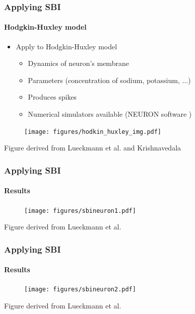 \documentclass[9pt, aspectratio=169]{beamer}
\begin{document}
\begin{frame}
\frametitle{Applying SBI}
\framesubtitle{Hodgkin-Huxley model}
\begin{itemize}	
	\item Apply to Hodgkin-Huxley model \cite{hodgkin1952quantitative} 
	\begin{itemize}
		\item Dynamics of neuron's membrane
		\item Parameters (concentration of sodium, potassium, ...)
		\item Produces spikes
		\item Numerical simulators available (NEURON software \cite{carnevale2006neuron})
	\end{itemize}
\end{itemize}
\begin{figure}
	\texttt{[image: figures/hodkin\_huxley\_img.pdf]}
\end{figure}
\tiny Figure derived from Lueckmann et al. \cite{lueckmann2017flexible} and Krishnavedala 
\end{frame}  

\begin{frame}
\frametitle{Applying SBI}
\framesubtitle{Results}
\begin{figure}
	\texttt{[image: figures/sbineuron1.pdf]}
\end{figure}
\vspace{50pt}
\tiny Figure derived from Lueckmann et al. \cite{lueckmann2017flexible}
\end{frame}  
\begin{frame}
\frametitle{Applying SBI}
\framesubtitle{Results}
\begin{figure}
	\texttt{[image: figures/sbineuron2.pdf]}
\end{figure}
\vspace{50pt}
\tiny Figure derived from Lueckmann et al. \cite{lueckmann2017flexible}
\end{frame}  
\end{document}
